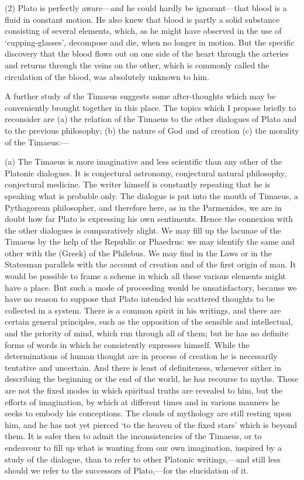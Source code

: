 (2) Plato is perfectly aware—and he could hardly be ignorant—that
blood is a fluid in constant motion. He also knew that blood is partly a
solid substance consisting of several elements, which, as he might have
observed in the use of ‘cupping-glasses’, decompose and die, when no
longer in motion. But the specific discovery that the blood flows out on
one side of the heart through the arteries and returns through the veins
on the other, which is commonly called the circulation of the blood, was
absolutely unknown to him.

A further study of the Timaeus suggests some after-thoughts which may be
conveniently brought together in this place. The topics which I propose
briefly to reconsider are (a) the relation of the Timaeus to the other
dialogues of Plato and to the previous philosophy; (b) the nature of God
and of creation (c) the morality of the Timaeus:—

(a) The Timaeus is more imaginative and less scientific than any other of
the Platonic dialogues. It is conjectural astronomy, conjectural natural
philosophy, conjectural medicine. The writer himself is constantly
repeating that he is speaking what is probable only. The dialogue is put
into the mouth of Timaeus, a Pythagorean philosopher, and therefore here,
as in the Parmenides, we are in doubt how far Plato is expressing his own
sentiments. Hence the connexion with the other dialogues is comparatively
slight. We may fill up the lacunae of the Timaeus by the help of the
Republic or Phaedrus: we may identify the same and other with the (Greek)
of the Philebus. We may find in the Laws or in the Statesman parallels
with the account of creation and of the first origin of man. It would be
possible to frame a scheme in which all these various elements might have
a place. But such a mode of proceeding would be unsatisfactory, because we
have no reason to suppose that Plato intended his scattered thoughts to be
collected in a system. There is a common spirit in his writings, and there
are certain general principles, such as the opposition of the sensible and
intellectual, and the priority of mind, which run through all of them; but
he has no definite forms of words in which he consistently expresses
himself. While the determinations of human thought are in process of
creation he is necessarily tentative and uncertain. And there is least of
definiteness, whenever either in describing the beginning or the end of
the world, he has recourse to myths. These are not the fixed modes in
which spiritual truths are revealed to him, but the efforts of
imagination, by which at different times and in various manners he seeks
to embody his conceptions. The clouds of mythology are still resting upon
him, and he has not yet pierced ‘to the heaven of the fixed stars’ which
is beyond them. It is safer then to admit the inconsistencies of the
Timaeus, or to endeavour to fill up what is wanting from our own
imagination, inspired by a study of the dialogue, than to refer to other
Platonic writings,—and still less should we refer to the successors
of Plato,—for the elucidation of it.

